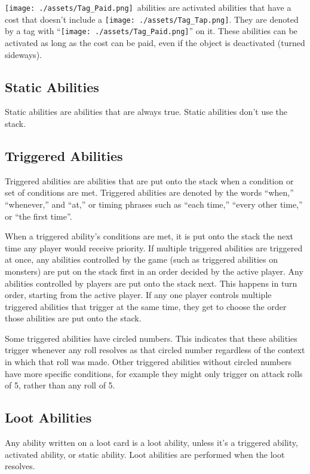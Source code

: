 \documentclass[10pt, a4paper, twoside]{article} %
\newcommand{\tap}{\texttt{[image: ./assets/Tag\_Tap.png]}}
\newcommand{\pay}{\texttt{[image: ./assets/Tag\_Paid.png]}}
\begin{document}
    \pay\ abilities are activated abilities that have a cost that doesn’t include a \tap. They are denoted by a tag with “\pay” on it. These abilities can be activated as long as the cost can be paid, even if the object is deactivated (turned sideways).

    \subsection{Static Abilities}
    Static abilities are abilities that are always true. Static abilities don’t use the stack.

    \subsection{Triggered Abilities}
    Triggered abilities are abilities that are put onto the stack when a condition or set of conditions are met. Triggered abilities are denoted by the words “when,” “whenever,” and “at,” or timing phrases such as “each time,” “every other time,” or “the first time”.

    When a triggered ability’s conditions are met, it is put onto the stack the next time any player would receive priority. If multiple triggered abilities are triggered at once, any abilities controlled by the game (such as triggered abilities on monsters) are put on the stack first in an order decided by the active player. Any abilities controlled by players are put onto the stack next. This happens in turn order, starting from the active player. If any one player controls multiple triggered abilities that trigger at the same time, they get to choose the order those abilities are put onto the stack.

    Some triggered abilities have circled numbers. This indicates that these abilities trigger whenever any roll resolves as that circled number regardless of the context in which that roll was made. Other triggered abilities without circled numbers have more specific conditions, for example they might only trigger on attack rolls of 5, rather than any roll of 5.

    \subsection{Loot Abilities}
    Any ability written on a loot card is a loot ability, unless it’s a triggered ability, activated ability, or static ability. Loot abilities are performed when the loot resolves.
\end{document}
